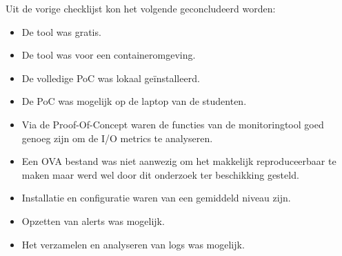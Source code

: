 Uit de vorige checklijst kon het volgende geconcludeerd worden:

\begin{itemize}
    \item De tool was gratis. 
    \item De tool was voor een containeromgeving.
    \item De volledige PoC was lokaal geïnstalleerd.
    \item De PoC was mogelijk op de laptop van de studenten.
    \item Via de Proof-Of-Concept waren de functies van de monitoringtool goed genoeg zijn om de I/O metrics te analyseren.
    \item Een OVA bestand was niet aanwezig om het makkelijk reproduceerbaar te maken maar werd wel door dit onderzoek ter beschikking gesteld.
    \item Installatie en configuratie waren van een gemiddeld niveau zijn.
    \item Opzetten van alerts was mogelijk.
    \item Het verzamelen en analyseren van logs was mogelijk. 
\end{itemize}

